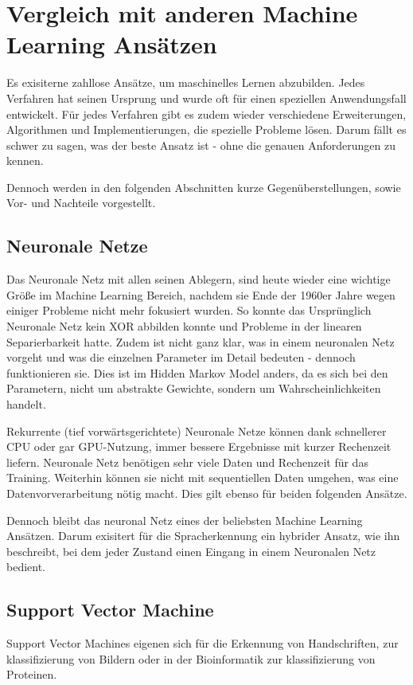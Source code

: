 \chapter{Vergleich mit anderen Machine Learning Ansätzen}  \label{mainsec:comp}
Es exisiterne zahllose Ansätze, um maschinelles Lernen abzubilden. Jedes Verfahren hat seinen Ursprung und wurde oft für einen speziellen Anwendungsfall entwickelt. Für jedes Verfahren gibt es zudem wieder verschiedene Erweiterungen, Algorithmen und Implementierungen, die spezielle Probleme lösen. Darum fällt es schwer zu sagen, was der beste Ansatz ist - ohne die genauen Anforderungen zu kennen.

Dennoch werden in den folgenden Abschnitten kurze Gegenüberstellungen, sowie Vor- und Nachteile vorgestellt.


\section{Neuronale Netze} \label{sec:neuron}
Das Neuronale Netz mit allen seinen Ablegern, sind heute wieder eine wichtige Größe im Machine Learning Bereich, nachdem sie Ende der 1960er Jahre wegen einiger Probleme nicht mehr fokusiert wurden. So konnte das Ursprünglich Neuronale Netz kein XOR abbilden konnte und Probleme in der linearen Separierbarkeit hatte. Zudem ist nicht ganz klar, was in einem  neuronalen Netz vorgeht und was die einzelnen Parameter im Detail bedeuten \cite[167]{marsland} - dennoch funktionieren sie. Dies ist im Hidden Markov Model anders, da es sich bei den Parametern, nicht um abstrakte Gewichte, sondern um Wahrscheinlichkeiten handelt.

Rekurrente (tief vorwärtsgerichtete) Neuronale Netze können dank schnellerer CPU oder gar GPU-Nutzung, immer bessere Ergebnisse mit kurzer Rechenzeit liefern. 
Neuronale Netz benötigen sehr viele Daten und Rechenzeit für das Training. Weiterhin können sie nicht mit sequentiellen Daten umgehen, was eine Datenvorverarbeitung nötig macht. Dies gilt ebenso für beiden folgenden Ansätze.

Dennoch bleibt das neuronal Netz eines der beliebsten Machine Learning Ansätzen. Darum exisitert für die Spracherkennung ein hybrider Ansatz, wie ihn \cite{hmmnn} beschreibt, bei dem jeder Zustand einen Eingang in einem Neuronalen Netz bedient.


\section{Support Vector Machine} \label{sec:svm}
Support Vector Machines eigenen sich für die Erkennung von Handschriften, zur klassifizierung von Bildern oder in der Bioinformatik zur klassifizierung von Proteinen.


